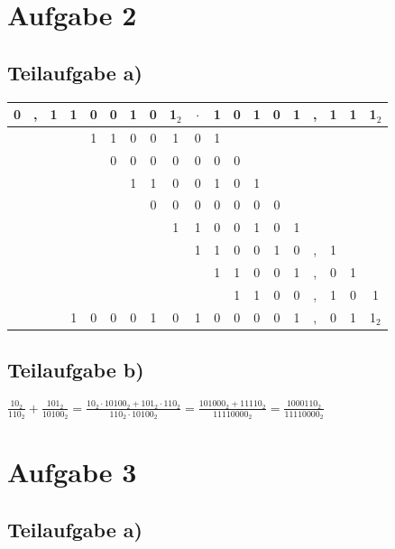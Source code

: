\documentclass{llncs}
\begin{document}
\section*{Aufgabe 2}
\subsection*{Teilaufgabe a)}

\begin{tabular}{ccccccccccccccccccc}
0&,&1&1&0&0&1&0&1$_2$&$\cdot$&1&0&1&0&1&,&1&1&1$_2$\\
\hline
 & & & &1&1&0&0&1&0      &1& & & & & & & & \\
 & & & & &0&0&0&0&0      &0&0& & & & & & & \\
 & & & & & &1&1&0&0      &1&0&1& & & & & & \\
 & & & & & & &0&0&0      &0&0&0&0& & & & & \\
 & & & & & & & &1&1      &0&0&1&0&1& & & & \\
 & & & & & & & & &1      &1&0&0&1&0&,&1& & \\
 & & & & & & & & &       &1&1&0&0&1&,&0&1& \\
 & & & & & & & & &       & &1&1&0&0&,&1&0&1\\
\hline
 & & &1&0&0&0&1&0&1      &0&0&0&0&1&,&0&1&1$_2$\\
\end{tabular}

\subsection*{Teilaufgabe b)}

$\frac{10_2}{110_2} + \frac{101_2}{10100_2} = \frac{10_2 \cdot 10100_2 + 101_2 \cdot 110_2}{110_2 \cdot 10100_2} = \frac{101000_2 + 11110_2}{11110000_2} = \frac{1000110_2}{11110000_2}$
\newpage

\section*{Aufgabe 3}

\subsection*{Teilaufgabe a)}
\end{document}
